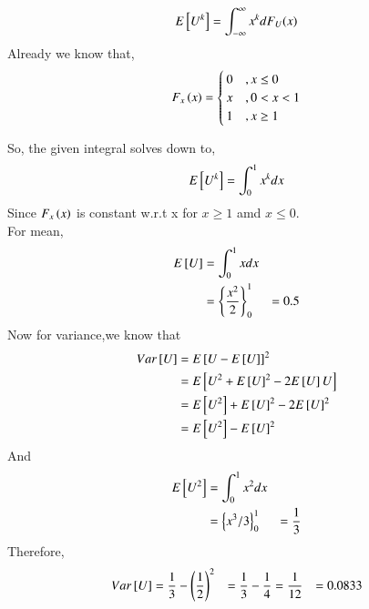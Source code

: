 \documentclass[journal,12pt,twocolumn]{IEEEtran}
\begin{document}
%
\begin{equation}
E{}\left[U^k\right] = \int_{-\infty}^{\infty}x^kdF_{U}(x)
\end{equation}
\solution Already we know that,
                \begin{equation*}
                                 F_{x}\left(x\right) = \begin{cases}
                                                          0  &, x \leq 0 \\
                                                          x  &, 0<x<1 \\
                                                          1  & , x \geq 1
                                                        \end{cases}
                 \end{equation*}

So, the given integral solves down to,
 \begin{equation}
	 E{}\left[U^k\right] = \int_{0}^{1}x^kdx
 \end{equation}
Since $F_{x}\left(x\right)$ is constant w.r.t x for $ x \geq 1 $ amd $ x \leq 0 $.\\
For mean,
  \begin{align}
	  E{}\left[U\right] &= \int_{0}^{1}xdx\\
	             &=\left\{ \frac{x^{2}}{2}\right\}_{0}^{1} 
              &= 0.5
  \end{align}
Now for variance,we know that
  \begin{align}
	  Var{}\left[U\right] &= E{}\left[U- E{}\left[U\right]\right]^2 \\
		       &= E{}\left[U^{2} + E{}\left[U\right]^{2} - 2E{}\left[U\right]U\right]\\
		       &= E{}\left[U^{2}\right] + E{}\left[U\right]^{2} - 2E{}\left[U\right]^{2}\\
		       &= E{}\left[U^{2}\right] - E{}\left[U\right]^{2} \label{eq:1-8}
  \end{align}
And 
  \begin{align}
	  E{}\left[U^{2}\right] &= \int_{0}^{1}x^{2}dx\\
			 &=\left\{ x^{3}/3\right\}_{0}^{1}
			 &= \frac{1}{3}
  \end{align}
  Therefore,
  \begin{align}
	  Var{}\left[U\right] &= \frac{1}{3} -\left( \frac{1}{2}\right)^{2}
		       &= \frac{1}{3} - \frac{1}{4}
		       &= \frac{1}{12}
		       &= 0.0833
  \end{align}
\end{document}
